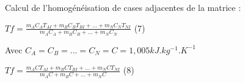 \documentclass{article}
\begin{document}
\begin{flushleft}
\begin{Large}
\par\leavevmode\par
\par\leavevmode\par
\par\leavevmode\par

Calcul de l'homog\'en\'eisation de cases adjacentes de la matrice :
\par\leavevmode\par

$Tf = \frac{m_{A}C_{A}T_{AI}+m_{B}C_{B}T_{BI}+...+m_{N}C_{N}T_{NI}}{m_{A}C_{A}+m_{B}C_{B}+...+m_{N}C_{N}}$ (7)
\par\leavevmode\par


Avec $C_{A}=C_{B}=...=C_{N}=C=1,005  kJ.kg^{-1}.K^{-1}$
\par\leavevmode\par

$Tf = \frac{m_{A}CT_{AI}+m_{B}CT_{BI}+...+m_{N}CT_{NI}}{m_{A}C+m_{B}C+...+m_{N}C}$ (8)






\end{Large}
\end{flushleft}
\end{document}
